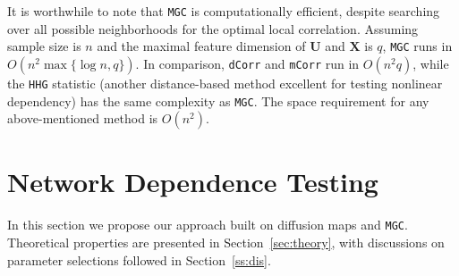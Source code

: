\documentclass[12pt]{article}
\theoremstyle{definition}
\begin{document}
	It is worthwhile to note that \texttt{MGC} is computationally efficient, despite searching over all possible neighborhoods for the optimal local correlation. Assuming sample size is $n$ and the maximal feature dimension of $\mathbf{U}$ and $\mathbf{X}$ is $q$, \texttt{MGC} runs in $O(n^2 \max\{\log n,q\})$. In comparison, \texttt{dCorr} and \texttt{mCorr} run in $O(n^2 q)$, while the \texttt{HHG} statistic (another distance-based method excellent for testing nonlinear dependency) has the same complexity as \texttt{MGC}. The space requirement for any above-mentioned method is $O(n^2)$.
	
	\section{Network Dependence Testing}
	\label{sec:method}
	In this section we propose our approach built on diffusion maps and \texttt{MGC}. Theoretical properties are presented in Section~\ref{sec:theory}, with discussions on parameter selections followed in Section~\ref{ss:dis}.
	
\end{document}
